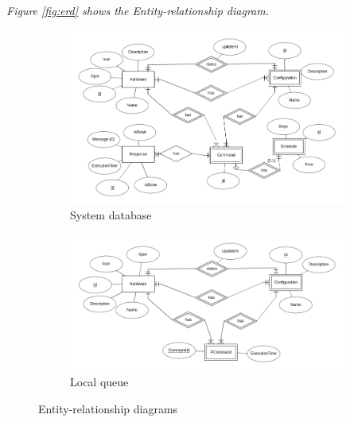 \documentclass[12pt, oneside, a4paper]{book}
\begin{document}
			\textit{Figure \ref{fig:erd} shows the Entity-relationship diagram.} 
					\begin{figure}[H]
						\label{fig:erd}
						\begin{subfigure}[b]{\linewidth}
							\includegraphics[width=\linewidth]{img/diagram_er1.png}
							\caption{System database}
						\end{subfigure}

						\begin{subfigure}[b]{\linewidth}
							\includegraphics[width=\linewidth]{img/diagram_er2.png}
							\caption{Local queue}
						\end{subfigure}
						\caption{Entity-relationship diagrams}
					\end{figure}
				
\end{document}
